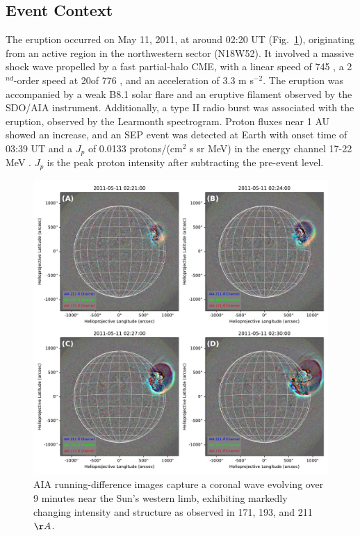 \subsection{Event Context}
The eruption occurred on May 11, 2011, at around 02:20 UT (Fig.~\ref{fig_aia_event}), originating from an active region in the northwestern sector (N18W52). It involved a massive shock wave propelled by a fast partial-halo CME, with a linear speed of 745 \kms, a 2$^{nd}$-order speed at 20\rsun of 776 \kms, and an acceleration of 3.3 m s$^{-2}$. The eruption was accompanied by a weak B8.1 solar flare and an eruptive filament observed by the SDO/AIA instrument.
Additionally, a type II radio burst was associated with the eruption, observed by the Learmonth spectrogram. Proton fluxes near 1 AU showed an increase, and an SEP event was detected at Earth with onset time of 03:39 UT and a $J_p$ of 0.0133 protons/(cm$^2$ s sr MeV) in the energy channel 17-22 MeV \citep{miteva_2016, miteva_2017}.  $J_p$ is the peak proton intensity after subtracting the pre-event level.

\begin{figure}[!htp] %
	\centerline{\includegraphics[width=0.8\columnwidth]{chapter2/figs/RGB_panel.pdf}}
	\caption{AIA running-difference images capture a coronal wave evolving over 9 minutes near the Sun's western limb, exhibiting markedly changing intensity and structure as observed in 171, 193, and 211 $\AA$.}
	\label{fig_aia_event}
\end{figure}

